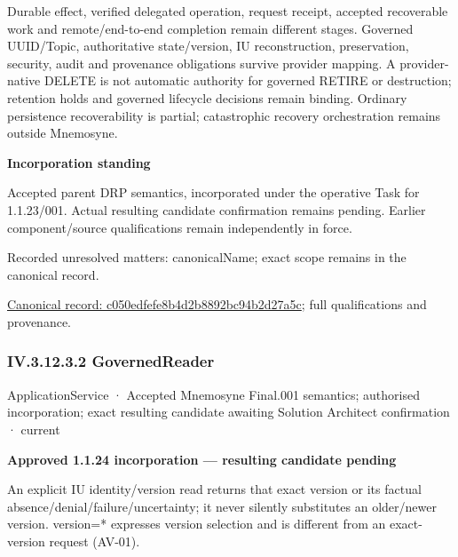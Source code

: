 Durable effect, verified delegated operation, request receipt, accepted recoverable work and remote/end-to-end completion remain different stages. Governed UUID/Topic, authoritative state/version, IU reconstruction, preservation, security, audit and provenance obligations survive provider mapping. A provider-native DELETE is not automatic authority for governed RETIRE or destruction; retention holds and governed lifecycle decisions remain binding. Ordinary persistence recoverability is partial; catastrophic recovery orchestration remains outside Mnemosyne.



\par\medskip\textbf{Incorporation standing}\par


Accepted parent DRP semantics, incorporated under the operative Task for 1.1.23/001. Actual resulting candidate confirmation remains pending. Earlier component/source qualifications remain independently in force.


{\small Recorded unresolved matters: canonicalName; exact scope remains in the canonical record.}\par
{\footnotesize \href{../../../../../../../continuum/application/application-service/c050edfefe8b4d2b8892bc94b2d27a5c.md}{Canonical record: c050edfefe8b4d2b8892bc94b2d27a5c}; full qualifications and provenance.}\par
\subsubsection*{IV.3.12.3.2 GovernedReader}
\label{navigation:IV.3.12.3.2}

\label{element:410a938f42964474b7cf5655815dc830}
{\small ApplicationService · Accepted Mnemosyne Final.001 semantics; authorised incorporation; exact resulting candidate awaiting Solution Architect confirmation · current}\par

\par\medskip\textbf{Approved 1.1.24 incorporation — resulting candidate pending}\par


An explicit IU identity/version read returns that exact version or its factual absence/denial/failure/uncertainty; it never silently substitutes an older/newer version. version=* expresses version selection and is different from an exact-version request (AV-01).



